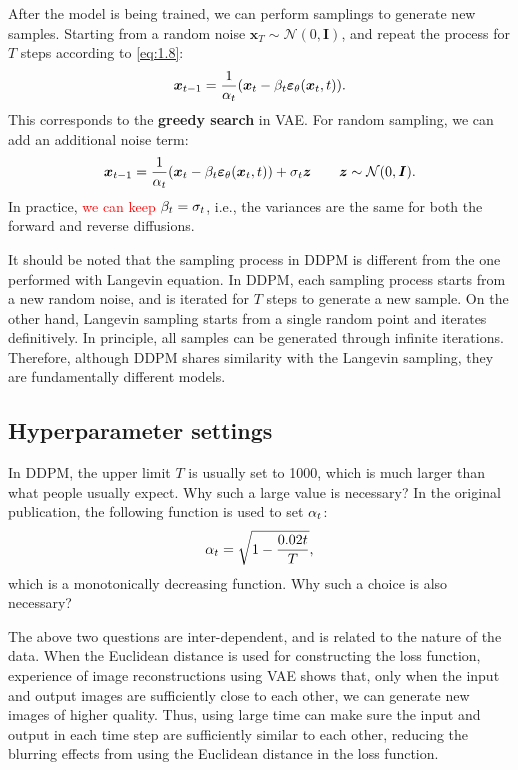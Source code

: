 After the model is being trained, we can perform samplings to generate new samples. Starting from a random noise $\bm{x}_T\sim\mathcal{N}(0,\bm{I})$, and repeat the process for $T$ steps according to \cref{eq:1.8}:
\begin{equation}
    \label{eq:1.16}
    \bm{x}_{t-1}=\frac{1}{\alpha_t}(\bm{x}_{t}-\beta_t\bm{\varepsilon}_\theta(\bm{x}_{t},t)).
\end{equation}
This corresponds to the \textbf{greedy search} in VAE. For random sampling, we can add an additional noise term:
\begin{equation}
    \label{eq:1.17}
    \bm{x}_{t-1}=\frac{1}{\alpha_t}(\bm{x}_{t}-\beta_t\bm{\varepsilon}_\theta(\bm{x}_{t},t))+\sigma_t \bm{z}\qquad \bm{z}\sim\mathcal{N}(0,\bm{I}).
\end{equation}
In practice, \textcolor{red}{we can keep $\beta_t=\sigma_t$}, i.e., the variances are the same for both the forward and reverse diffusions.

It should be noted that the sampling process in DDPM is different from the one performed with Langevin equation. In DDPM, each sampling process starts from a new random noise, and is iterated for $T$ steps to generate a new sample. On the other hand, Langevin sampling starts from a single random point and iterates definitively. In principle, all samples can be generated through infinite iterations. Therefore, although DDPM shares similarity with the Langevin sampling, they are fundamentally different models.

\subsection{Hyperparameter settings}
In DDPM, the upper limit $T$ is usually set to 1000, which is much larger than what people usually expect. Why such a large value is necessary? In the original publication, the following function is used to set $\alpha_t$:
\begin{equation}
    \label{eq:1.18}
    \alpha_t=\sqrt{1-\frac{0.02t}{T}},
\end{equation}
which is a monotonically decreasing function. Why such a choice is also necessary?

The above two questions are inter-dependent, and is related to the nature of the data. When the Euclidean distance is used for constructing the loss function, experience of image reconstructions using VAE shows that, only when the input and output images are sufficiently close to each other, we can generate new images of higher quality. Thus, using large time can make sure the input and output in each time step are sufficiently similar to each other, reducing the blurring effects from using the Euclidean distance in the loss function. 

